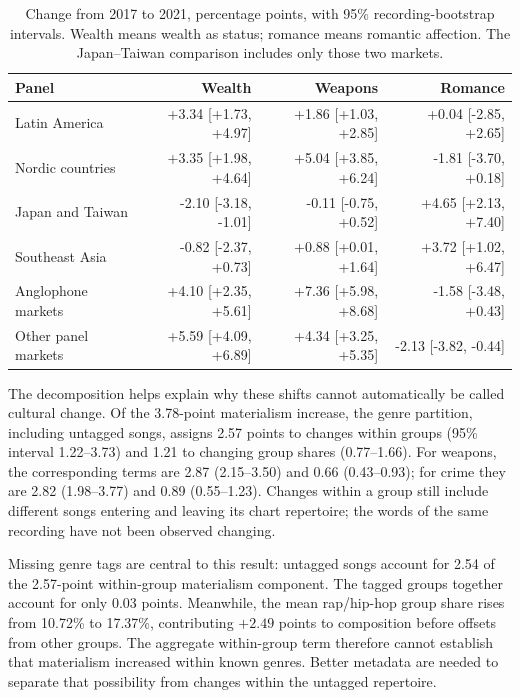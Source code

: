 \documentclass[10pt,a4paper,twocolumn]{article}
\begin{document}
\begin{table}[t]
\caption{Change from 2017 to 2021, percentage points, with 95\% recording-bootstrap intervals. Wealth means wealth as status; romance means romantic affection. The Japan--Taiwan comparison includes only those two markets.}
\label{tab:regional-revision}
\centering\small\setlength{\tabcolsep}{5pt}
\begin{tabularx}{\textwidth}{@{}Xrrr@{}}
\toprule Panel & Wealth & Weapons & Romance \\
\midrule
Latin America & +3.34 [+1.73, +4.97] & +1.86 [+1.03, +2.85] & +0.04 [-2.85, +2.65] \\
Nordic countries & +3.35 [+1.98, +4.64] & +5.04 [+3.85, +6.24] & -1.81 [-3.70, +0.18] \\
Japan and Taiwan & -2.10 [-3.18, -1.01] & -0.11 [-0.75, +0.52] & +4.65 [+2.13, +7.40] \\
Southeast Asia & -0.82 [-2.37, +0.73] & +0.88 [+0.01, +1.64] & +3.72 [+1.02, +6.47] \\
Anglophone markets & +4.10 [+2.35, +5.61] & +7.36 [+5.98, +8.68] & -1.58 [-3.48, +0.43] \\
Other panel markets & +5.59 [+4.09, +6.89] & +4.34 [+3.25, +5.35] & -2.13 [-3.82, -0.44] \\
\bottomrule
\end{tabularx}
\end{table}

The decomposition helps explain why these shifts cannot automatically be called cultural change. Of the 3.78-point materialism increase, the genre partition, including untagged songs, assigns 2.57 points to changes within groups (95\% interval 1.22--3.73) and 1.21 to changing group shares (0.77--1.66). For weapons, the corresponding terms are 2.87 (2.15--3.50) and 0.66 (0.43--0.93); for crime they are 2.82 (1.98--3.77) and 0.89 (0.55--1.23). Changes within a group still include different songs entering and leaving its chart repertoire; the words of the same recording have not been observed changing.

Missing genre tags are central to this result: untagged songs account for 2.54 of the 2.57-point within-group materialism component. The tagged groups together account for only 0.03 points. Meanwhile, the mean rap/hip-hop group share rises from 10.72\% to 17.37\%, contributing $+2.49$ points to composition before offsets from other groups. The aggregate within-group term therefore cannot establish that materialism increased within known genres. Better metadata are needed to separate that possibility from changes within the untagged repertoire.
\end{document}
